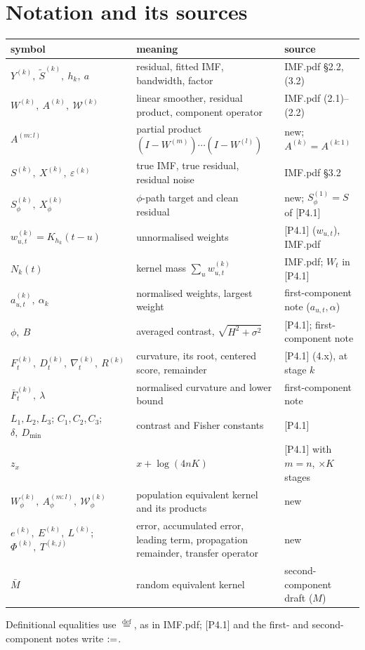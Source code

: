 \documentclass[11pt]{article}
\newcommand{\IMFt}{\widetilde S}
\newcommand{\Wcal}{\mathcal W}
\theoremstyle{definition}
\begin{document}
\section{Notation and its sources}\label{sec:notation}
\footnotesize
\begin{tabular}{p{}p{}p{}}
\toprule
symbol & meaning & source\\
\midrule
\(Y^{(k)},\ \IMFt^{(k)},\ h_k,\ a\) & residual, fitted IMF, bandwidth, factor & IMF.pdf \S2.2, (3.2)\\
\(W^{(k)},\ A^{(k)},\ \Wcal^{(k)}\) & linear smoother, residual product, component operator & IMF.pdf (2.1)--(2.2)\\
\(A^{(m:l)}\) & partial product \((I-W^{(m)})\cdots(I-W^{(l)})\) & new; \(A^{(k)}=A^{(k:1)}\)\\
\(S^{(k)},\ X^{(k)},\ \varepsilon^{(k)}\) & true IMF, true residual, residual noise & IMF.pdf \S3.2\\
\(S^{(k)}_\phi,\ X^{(k)}_\phi\) & \(\phi\)-path target and clean residual & new; \(S^{(1)}_\phi=S\) of [P4.1]\\
\(w^{(k)}_{u,t}=K_{h_k}(t-u)\) & unnormalised weights & [P4.1] (\(w_{u,t}\)), IMF.pdf\\
\(N_k(t)\) & kernel mass \(\sum_uw^{(k)}_{u,t}\) & IMF.pdf; \(W_t\) in [P4.1]\\
\(a^{(k)}_{u,t},\ \alpha_k\) & normalised weights, largest weight & first-component note (\(a_{u,t},\alpha\))\\
\(\phi,\ B\) & averaged contrast, \(\sqrt{H^2+\sigma^2}\) & [P4.1]; first-component note\\
\(F^{(k)}_t,\ D^{(k)}_t,\ \nabla^{(k)}_t,\ R^{(k)}\) & curvature, its root, centered score, remainder & [P4.1] (4.x), at stage \(k\)\\
\(\bar F^{(k)}_t,\ \lambda\) & normalised curvature and lower bound & first-component note\\
\(L_1,L_2,L_3\); \(C_1,C_2,C_3\); \(\delta,\ D_{\min}\) & contrast and Fisher constants & [P4.1]\\
\(z_x\) & \(x+\log(4nK)\) & [P4.1] with \(m=n\), \(\times K\) stages\\
\(W^{(k)}_\phi,\ A^{(m:l)}_\phi,\ \Wcal^{(k)}_\phi\) & population equivalent kernel and its products & new\\
\(e^{(k)},\ E^{(k)},\ L^{(k)}\); \(\Phi^{(k)},\ T^{(k,j)}\) & error, accumulated error, leading term, propagation remainder, transfer operator & new\\
\(\bar M\) & random equivalent kernel & second-component draft (\(M\))\\
\bottomrule
\end{tabular}

\medskip\noindent
Definitional equalities use \(\stackrel{\mathrm{def}}{=}\), as in IMF.pdf;
[P4.1] and the first- and second-component notes write \(\vcentcolon=\).
\end{document}
